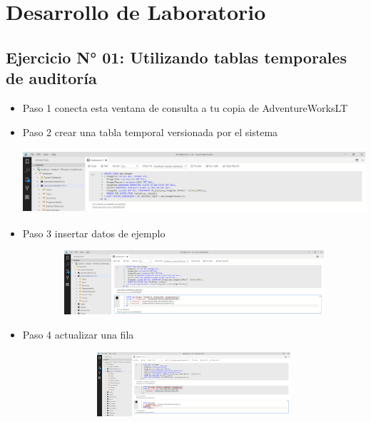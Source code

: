 \section{Desarrollo de Laboratorio}
\subsection{Ejercicio N° 01: Utilizando tablas temporales de auditoría}
\begin{itemize}  \item Paso 1 conecta esta ventana de consulta a tu copia de AdventureWorksLT
				 \item Paso 2 crear una tabla temporal versionada por el sistema
				 	
					\begin{center}
    				\includegraphics[width=16cm, height=90]{./Imagenes/Imagen1}
   				    \end{center}
				 

				 \item Paso 3 insertar datos de ejemplo
				 
				 	\begin{center}
    				\includegraphics[width=16cm, height=90]{./Imagenes/Imagen2}
   				    \end{center}
				 
				 \item Paso 4 actualizar una fila
				 
				 
				 \begin{center}
    				\includegraphics[width=16cm, height=90]{./Imagenes/Imagen3}
   				    \end{center}
				 

\end{itemize}
